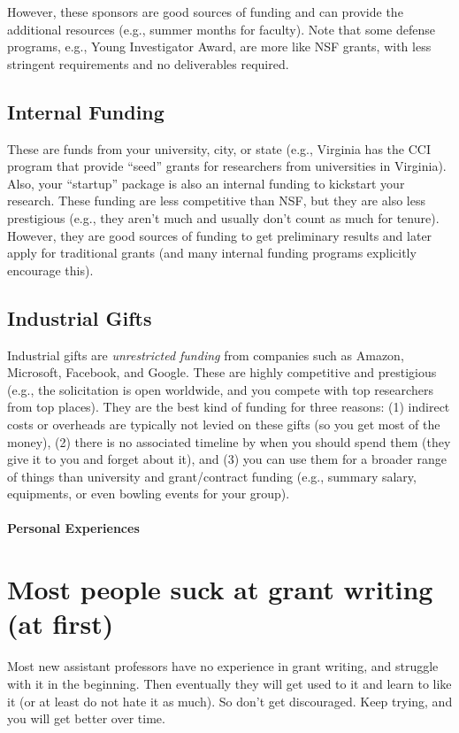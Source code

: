 \documentclass[oneside,11pt,dvipsnames]{book}
\begin{document}
However, these sponsors are good sources of funding and can provide the additional resources (e.g., summer months for faculty). Note that some defense programs, e.g., Young Investigator Award, are more like NSF grants, with less stringent requirements and no deliverables required. 


\subsection{Internal Funding}
These are funds from your university, city, or state (e.g., Virginia has the CCI program that provide ``seed'' grants for researchers from universities in Virginia).  Also, your ``startup'' package is also an internal funding to kickstart your research. These funding are less competitive than NSF, but they are also less prestigious (e.g., they aren't much and usually don't count as much for tenure).  However, they are good sources of funding to get preliminary results and later apply for traditional grants (and many internal funding programs explicitly encourage this). 

\subsection{Industrial Gifts}
Industrial gifts are \emph{unrestricted funding} from companies such as Amazon, Microsoft, Facebook, and Google. These are highly competitive and prestigious (e.g., the solicitation is open worldwide, and you compete with top researchers from top places).  They are the best kind of funding for three reasons: (1) indirect costs or overheads are typically not levied on these gifts (so you get most of the money), (2) there is no associated timeline by when you should spend them (they give it to you and forget about it), and (3) you can use them for a broader range of things than university and grant/contract funding (e.g., summary salary, equipments, or even bowling events for your group).

\paragraph{Personal Experiences}

\section{Most people suck at grant writing (at first)} Most new assistant professors have no experience in grant writing, and struggle with it in the beginning.  Then eventually they will get used to it and learn to like it (or at least do not hate it as much).  So don't get discouraged.  Keep trying, and you will get better over time.
\end{document}
